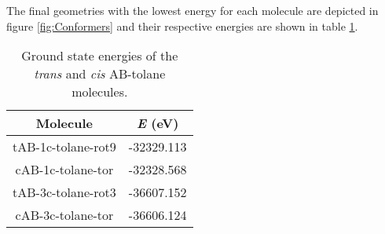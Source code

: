 %
The final geometries with the lowest energy for each molecule are depicted in figure \ref{fig:Conformers} and their respective energies are shown in table \ref{tab:GS-energy-conformers}.
%
%
\begin{table}[h]
\caption{Ground state energies of the \textit{trans} and \textit{cis} AB-tolane molecules.}
\label{tab:GS-energy-conformers}
\centering
\vspace{0.1 cm}
\begin{tabular}{cc} 
\toprule
Molecule           & \textit{E} (\si{\eV}) \\
\midrule
tAB-1c-tolane-rot9 & -32329.113  \\
cAB-1c-tolane-tor  & -32328.568 \\
\midrule
tAB-3c-tolane-rot3 & -36607.152 \\
cAB-3c-tolane-tor  & -36606.124 \\
\bottomrule
\end{tabular}
\end{table}
%
%
\begin{comment}
To determine the conformer with the lowest ground state energy, we had to to sample through a large number of different conformers. To automate this procedure the program CREST was used. The resulting ten lowest rotamers of the corresponding conformers were then optimized with DFT CAM-B3LYP D3\_BJ and the resulting GS energy is listed in Table (TABLE REF).

Since we were interested in conformers with the lowest ground state energy, we initially modeled those manually and then optimised the raw structures using DFT. Due to the vast possibilities in geometries this task was automated using 
\end{comment}

